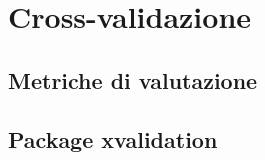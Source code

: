 \section{Cross-validazione}
\omissis{}

\subsection{Metriche di valutazione}
\omissis{}


\subsection{Package xvalidation}
\omissis{}


